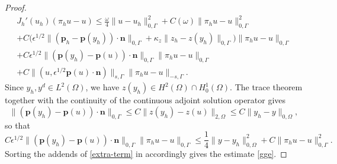 \documentclass[10pt,a4paper]{amsart}
\newcommand{\bn}{{\mathbf{n}}}
\newcommand{\bp}{{\mathbf{p}}}
\begin{document}
\begin{proof}
\begin{multline}
J_h'(u_h)(\pi_h u - u) \le \frac{\omega}{4}\|u-u_h\|_{0,\Gamma}^2+C(\omega) \|\pi_hu-u\|_{0,\Gamma}^2  \\ +C \big(\epsilon^{1/2}\|(\bp_h - \bp(y_h))\cdot\bn\|_{0,\Gamma}+\kappa_z\|z_h - z(y_h)\|_{0,\Gamma}\big)\|\pi_hu-u\|_{0,\Gamma}  \\ + C\epsilon^{1/2}\|(\bp(y_h)-\bp(u))\cdot\bn\|_{0,\Gamma}\|\pi_hu-u\|_{0,\Gamma}  \\ + C\|(u,\epsilon^{1/2}\bp(u)\cdot\bn)\|_{s,\Gamma}\|\pi_hu-u\|_{-s,\Gamma}.
\end{multline}
Since $y_h, y^d\in L^2(\Omega)$, we have 
$z(y_h) \in H^2(\Omega) \cap H_0^1(\Omega)$. The trace theorem together with the continuity of the continuous adjoint solution operator gives 
\begin{equation}\label{eqn:f7}
\|(\bp(y_h) - \bp(u))\cdot\bn\|_{0,\Gamma}\leq  C \|z(y_h) - z(u)\|_{2,\Omega}  \leq C \|y_h - y \|_{0,\Omega},
\end{equation}
so that
\[C \epsilon^{1/2}\|(\bp(y_h) - \bp(u))\cdot\bn\|_{0,\Gamma}\|\pi_hu-u\|_{0,\Gamma} \le \frac{1}{4}\|y-y_h\|_{0,\Omega}^2 + C\|\pi_hu-u\|_{0,\Gamma}^2.\]
Sorting the addends of \eqref{extra-term} in accordingly gives the estimate \eqref{gge}.
\end{proof}
\end{document}

